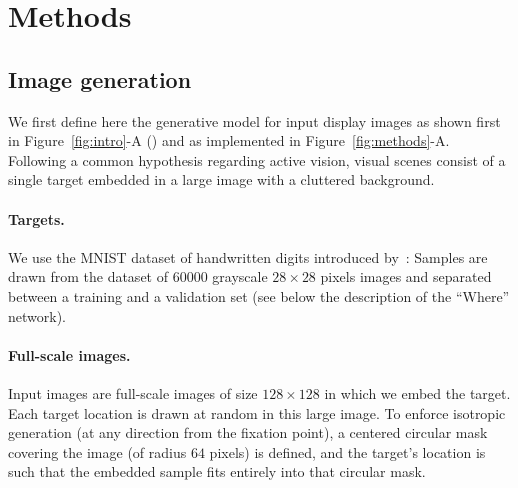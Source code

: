 \section{Methods}
\label{sec:implementation}

\subsection{Image generation}
We first define here the generative model for input display images as shown first in Figure~\ref{fig:intro}-A (\DIS ) and as implemented in Figure~\ref{fig:methods}-A. Following a common hypothesis regarding active vision, visual scenes consist of a single target embedded in a large image with a cluttered background.

\paragraph{Targets.}
We use the MNIST dataset of handwritten digits introduced by~\cite{Lecun1998}: %
Samples are drawn from the dataset of $60000$ grayscale $28\times 28$ pixels images and separated between a training and a validation set (see below the description of the ``Where'' network).

\paragraph{Full-scale images.}
Input images are full-scale images of size $128\times 128$ in which we embed the target.
Each target location is drawn at random in this large image. To enforce isotropic generation (at any direction from the fixation point), a centered circular mask covering the image (of radius $64$ pixels) is defined, and the target's location is such that the embedded sample fits entirely into that circular mask.

